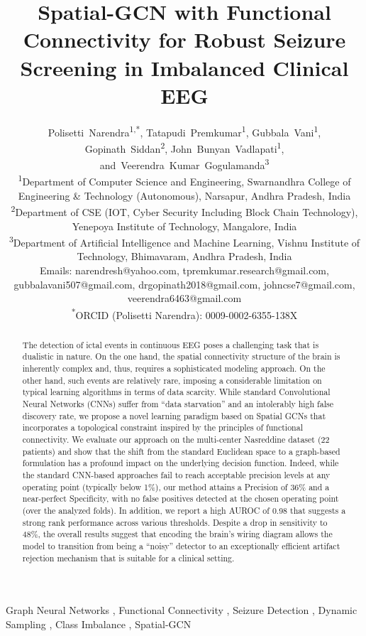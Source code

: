 \documentclass[journal]{IEEEtran}
\title{Spatial-GCN with Functional Connectivity for Robust Seizure Screening in Imbalanced Clinical EEG}
\author{Polisetti~Narendra\textsuperscript{1,*},
        Tatapudi~Premkumar\textsuperscript{1},
        Gubbala~Vani\textsuperscript{1},
        Gopinath~Siddan\textsuperscript{2},
        John~Bunyan~Vadlapati\textsuperscript{1},
        and~Veerendra~Kumar~Gogulamanda\textsuperscript{3}\\[0.3em]
\small\textsuperscript{1}Department of Computer Science and Engineering, Swarnandhra College of Engineering \& Technology (Autonomous), Narsapur, Andhra Pradesh, India\\
\small\textsuperscript{2}Department of CSE (IOT, Cyber Security Including Block Chain Technology), Yenepoya Institute of Technology, Mangalore, India\\
\small\textsuperscript{3}Department of Artificial Intelligence and Machine Learning, Vishnu Institute of Technology, Bhimavaram, Andhra Pradesh, India\\
\small Emails: narendresh@yahoo.com, tpremkumar.research@gmail.com, gubbalavani507@gmail.com, drgopinath2018@gmail.com, johncse7@gmail.com, veerendra6463@gmail.com\\
\small\textsuperscript{*}ORCID (Polisetti Narendra): 0009-0002-6355-138X}
\begin{document}
\maketitle

\begin{abstract}
The detection of ictal events in continuous EEG poses a challenging task that is dualistic in nature. On the one hand, the spatial connectivity structure of the brain is inherently complex and, thus, requires a sophisticated modeling approach. On the other hand, such events are relatively rare, imposing a considerable limitation on typical learning algorithms in terms of data scarcity. While standard Convolutional Neural Networks (CNNs) suffer from ``data starvation'' and an intolerably high false discovery rate, we propose a novel learning paradigm based on Spatial GCNs that incorporates a topological constraint inspired by the principles of functional connectivity. We evaluate our approach on the multi-center Nasreddine dataset (22 patients) and show that the shift from the standard Euclidean space to a graph-based formulation has a profound impact on the underlying decision function. Indeed, while the standard CNN-based approaches fail to reach acceptable precision levels at any operating point (typically below 1\%), our method attains a Precision of 36\% and a near-perfect Specificity, with no false positives detected at the chosen operating point (over the analyzed folds). In addition, we report a high AUROC of 0.98 that suggests a strong rank performance across various thresholds. Despite a drop in sensitivity to 48\%, the overall results suggest that encoding the brain's wiring diagram allows the model to transition from being a ``noisy'' detector to an exceptionally efficient artifact rejection mechanism that is suitable for a clinical setting.
\end{abstract}

\begin{IEEEkeywords}
Graph Neural Networks , Functional Connectivity , Seizure Detection , Dynamic Sampling , Class Imbalance , Spatial-GCN
\end{IEEEkeywords}




\end{document}
